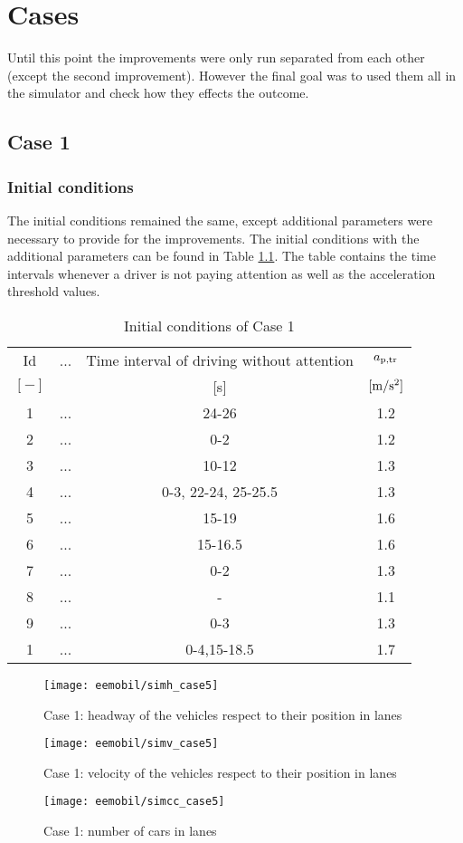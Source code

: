 \chapter{Cases}
		Until this point the improvements were only run separated from each other (except the second improvement). However the final goal was to used them all in the simulator and check how they effects the outcome.
		\section{Case 1}
			\subsection*{Initial conditions}
			The initial conditions remained the same, except additional parameters were necessary to provide for the improvements. The initial conditions with the additional parameters can be found in Table \ref{tab:new_array}. The table contains the time intervals whenever a driver is not paying attention as well as the acceleration threshold values.
			\begin{table}[ht]
				\begin{center}
					\begin{tabular}{ |c|c|c|c| }
						\hline
						Id & ... & Time interval of driving without attention & $a_{\rm p,tr}$\\
						$[-]$ & & [s]& $\rm [m/s^2]$\\
						\hline
						1 & ... & 24-26 & 1.2 \\
						2 & ... & 0-2 & 1.2 \\
						3 & ... & 10-12 & 1.3 \\
						4 & ... & 0-3, 22-24, 25-25.5 & 1.3 \\
						5 & ... & 15-19 & 1.6 \\
						6 & ... & 15-16.5 & 1.6 \\
						7 & ... & 0-2 & 1.3 \\
						8 & ... & - & 1.1 \\
						9 & ... & 0-3 & 1.3 \\
						1 & ... & 0-4,15-18.5 & 1.7 \\
						\hline
					\end{tabular}
				\end{center}
				\caption{Initial conditions of Case 1}
				\label{tab:new_array}
			\end{table}
			\begin{figure}
				\centering
				\texttt{[image: eemobil/simh\_case5]}
				\caption{Case 1: headway of the vehicles respect to their position in lanes}
				\label{fig:red_light_situationh2}
			\end{figure}
			\begin{figure}
				\centering
				\texttt{[image: eemobil/simv\_case5]}
				\caption{Case 1: velocity of the vehicles respect to their position in lanes}
				\label{fig:red_light_situationv2}
			\end{figure}
			\begin{figure}
				\centering
				\texttt{[image: eemobil/simcc\_case5]}
				\caption{Case 1: number of cars in lanes}
				\label{fig:red_light_situationcc2}
			\end{figure}
